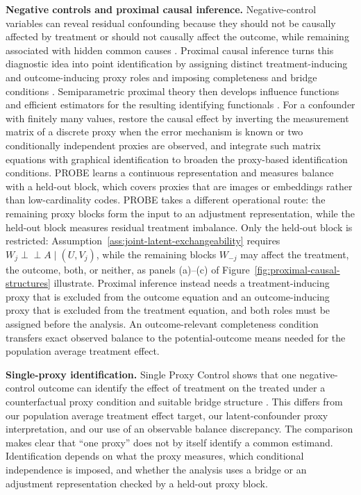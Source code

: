 \textbf{Negative controls and proximal causal inference.} Negative-control variables can reveal residual confounding because they should not be causally affected by treatment or should not causally affect the outcome, while remaining associated with hidden common causes \citep{lipsitch2010negative}. Proximal causal inference turns this diagnostic idea into point identification by assigning distinct treatment-inducing and outcome-inducing proxy roles and imposing completeness and bridge conditions \citep{miao2018proxy,tchetgen2024ProximalCausalInference}. Semiparametric proximal theory then develops influence functions and efficient estimators for the resulting identifying functionals \citep{cui2024semiparametric}. For a confounder with finitely many values, \citet{kuroki2014measurement} restore the causal effect by inverting the measurement matrix of a discrete proxy when the error mechanism is known or two conditionally independent proxies are observed, and \citet{lee2021matrix} integrate such matrix equations with graphical identification to broaden the proxy-based identification conditions. PROBE learns a continuous representation and measures balance with a held-out block, which covers proxies that are images or embeddings rather than low-cardinality codes. PROBE takes a different operational route: the remaining proxy blocks form the input to an adjustment representation, while the held-out block measures residual treatment imbalance. Only the held-out block is restricted: Assumption~\ref{ass:joint-latent-exchangeability} requires $W_j\perp\!\!\!\perp A\mid(U,V_j)$, while the remaining blocks $W_{-j}$ may affect the treatment, the outcome, both, or neither, as panels (a)--(c) of Figure~\ref{fig:proximal-causal-structures} illustrate. Proximal inference instead needs a treatment-inducing proxy that is excluded from the outcome equation and an outcome-inducing proxy that is excluded from the treatment equation, and both roles must be assigned before the analysis. An outcome-relevant completeness condition transfers exact observed balance to the potential-outcome means needed for the population average treatment effect.

\textbf{Single-proxy identification.} Single Proxy Control shows that one negative-control outcome can identify the effect of treatment on the treated under a counterfactual proxy condition and suitable bridge structure \citep{park2024single}. This differs from our population average treatment effect target, our latent-confounder proxy interpretation, and our use of an observable balance discrepancy. The comparison makes clear that ``one proxy'' does not by itself identify a common estimand. Identification depends on what the proxy measures, which conditional independence is imposed, and whether the analysis uses a bridge or an adjustment representation checked by a held-out proxy block.

